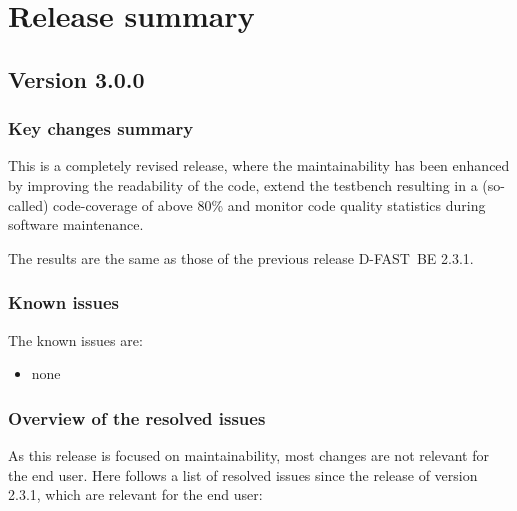\documentclass[git]{deltares_manual}
\newcommand{\dfmi}{\textrm{D-FAST~MI}\xspace}
\newcommand{\dfbe}{\textrm{D-FAST~BE}\xspace}
\begin{document}
\chapter{Release summary}

\section{Version 3.0.0}

\subsection{Key changes summary}
This is a completely revised release, where the maintainability has been enhanced by improving the readability of the code, extend the testbench resulting in a (so-called) code-coverage of above 80\% and monitor code quality statistics during software maintenance.

The results are the same as those of the previous release \dfbe 2.3.1.


\subsection{Known issues}

The known issues are:

\begin{itemize}
	\item none
\end{itemize}

\subsection{Overview of the resolved issues}

As this release is focused on maintainability, most changes are not relevant for the end user. Here follows a list of resolved issues since the release of version 2.3.1, which are relevant for the end user:
\end{document}
